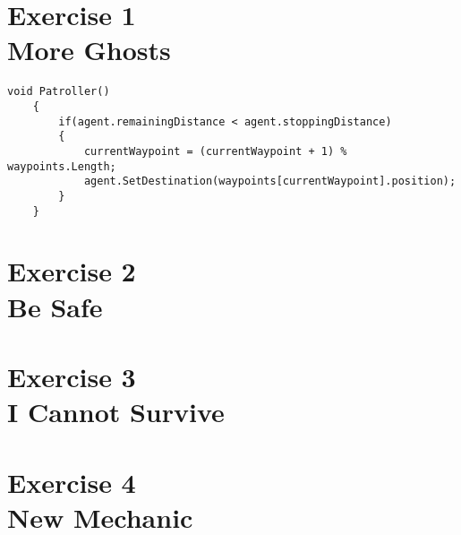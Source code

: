 \section[Exersice 1. More Ghosts]{Exercise 1\\ {\large More Ghosts}}

\begin{lstlisting}[caption=UnityScript]
    void Patroller()
    {
        if(agent.remainingDistance < agent.stoppingDistance)
        {
            currentWaypoint = (currentWaypoint + 1) % waypoints.Length;
            agent.SetDestination(waypoints[currentWaypoint].position);
        }
    }
\end{lstlisting}

\section[Exersice 2. Be Safe]{Exercise 2\\ {\large Be Safe}}

\section[Exercise 3. I Cannot Survive]{Exercise 3\\ {\large I Cannot Survive}}

\section[Exercise 4. New Mechanic]{Exercise 4\\ {\large New Mechanic}}